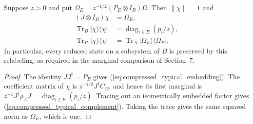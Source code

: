 \begin{theorem}
\label{thm:compressed_typical_vector}
\leanok
{}
Suppose $z>0$ and put $\Omega_E=z^{-1/2}(P_E\otimes I_B)\Omega$.
Then $\|\chi\|=1$ and
\begin{align}
  (J\otimes I_B)\chi&=\Omega_E,\label{eq:compressed_typical_embedding}\\
  \operatorname{Tr}_B|\chi\rangle\langle\chi|
    &=\operatorname{diag}_{i\in E}(p_i/z),\label{eq:compressed_typical_diagonal}\\
  \operatorname{Tr}_R|\chi\rangle\langle\chi|
    &=\operatorname{Tr}_A|\Omega_E\rangle\langle\Omega_E|.
    \label{eq:compressed_typical_complement}
\end{align}
In particular, every reduced state on a subsystem of $B$ is preserved by
this relabeling, as required in the marginal comparison of Section~7.
\end{theorem}
\begin{proof}
\leanok
{}
The identity $JJ^\dagger=P_E$ gives
(\ref{eq:compressed_typical_embedding}). The coefficient matrix of $\chi$ is
$z^{-1/2}J^\dagger C_\Omega$, and hence its first marginal is
$z^{-1}J^\dagger\rho_AJ=\operatorname{diag}_{i\in E}(p_i/z)$.
Tracing out an isometrically embedded factor gives
(\ref{eq:compressed_typical_complement}). Taking the trace gives the same
squared norm as $\Omega_E$, which is one.
\end{proof}
